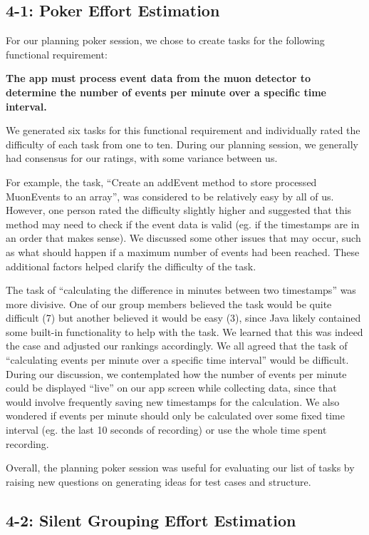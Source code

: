 \documentclass[11pt,a4paper]{article}
\begin{document}
\subsection*{4-1: Poker Effort Estimation}

For our planning poker session, we chose to create tasks for the following functional requirement:

\textbf{The app must process event data from the muon detector to determine the number of events per minute over a specific time interval.}

We generated six tasks for this functional requirement and individually rated the difficulty of each task from one to ten. During our planning session, we generally had consensus for our ratings, with some variance between us. 

For example, the task, “Create an addEvent method to store processed MuonEvents to an array”, was considered to be relatively easy by all of us. However, one person rated the difficulty slightly higher and suggested that this method may need to check if the event data is valid (eg. if the timestamps are in an order that makes sense). We discussed some other issues that may occur, such as what should happen if a maximum number of events had been reached. These additional factors helped clarify the difficulty of the task.

The task of “calculating the difference in minutes between two timestamps” was more divisive. One of our group members believed the task would be quite difficult (7) but another believed it would be easy (3), since Java likely contained some built-in functionality to help with the task. We learned that this was indeed the case and adjusted our rankings accordingly.
We all agreed that the task of “calculating events per minute over a specific time interval” would be difficult. During our discussion, we contemplated how the number of events per minute could be displayed “live” on our app screen while collecting data, since that would involve frequently saving new timestamps for the calculation. We also wondered if events per minute should only be calculated over some fixed time interval (eg. the last 10 seconds of recording) or use the whole time spent recording.

Overall, the planning poker session was useful for evaluating our list of tasks by raising new questions on generating ideas for test cases and structure.


\subsection*{4-2: Silent Grouping Effort Estimation}
\end{document}
